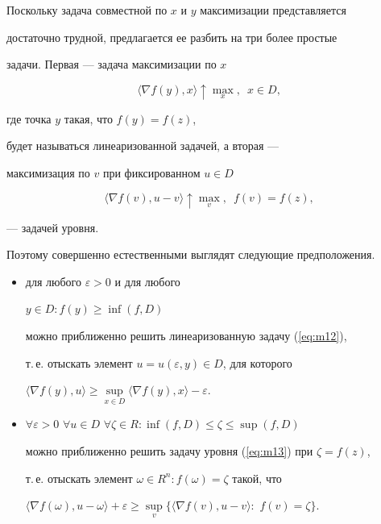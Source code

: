 Поскольку задача совместной по $x$ и $y$ максимизации представляется


достаточно трудной, предлагается ее разбить на три более простые


задачи. Первая --- задача максимизации по $x$


\begin{equation}


\langle \nabla f(y),x\rangle \uparrow \max_{x}, \ \; x\in D,


\label{eq:m12}


\end{equation}


где точка $y$ такая, что $f(y)=f(z)$,


будет называться линеаризованной задачей, а вторая --- 


максимизация по $v$ при фиксированном $u\in D$


\begin{equation}


\langle \nabla f(v),u-v\rangle \uparrow \max_{v}, \ \; f(v)=f(z),


\label{eq:m13}


\end{equation}


--- задачей уровня.


Поэтому совершенно естественными выглядят следующие предположения.





\begin{itemize}


\item[(HL):] для любого $\varepsilon >0$ и для любого


$y \in D: f(y)\geq \inf(f,D)$


можно приближенно решить линеаризованную задачу (\ref{eq:m12}),


т.\,е. отыскать элемент $u=u(\varepsilon,y)\in D $, для которого


$\langle \nabla f(y),u\rangle \geq


\sup\limits_{x\in D}\langle \nabla f(y),x\rangle -\varepsilon$.


\item[(HU):] $\forall \varepsilon >0$ $\forall u \in D$ $\forall \zeta \in R:


\inf(f,D)\leq \zeta \leq \sup(f,D)$


можно приближенно решить задачу уровня (\ref{eq:m13}) при $\zeta=f(z)$,


т.\,е. отыскать элемент $\omega \in R^{n}: f(\omega)=\zeta $ такой, что


$\langle \nabla f(\omega ),u-\omega \rangle + \varepsilon \geq


\sup\limits_{v}\{ \langle \nabla f(v),u-v \rangle :\,\, f(v)=\zeta \}$.


\end{itemize}


